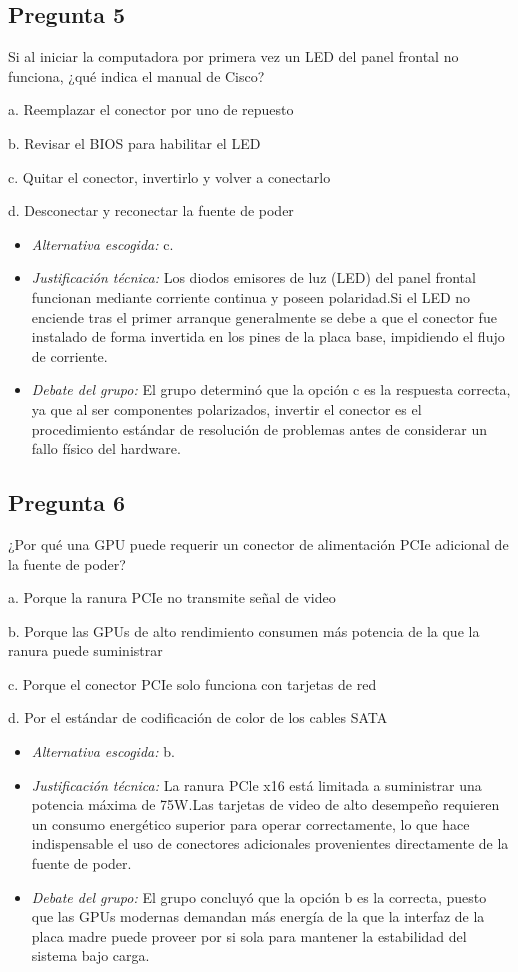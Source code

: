 \documentclass{article}
\begin{document}
\subsection{Pregunta 5}
\label{sec:org04b324c}
Si al iniciar la computadora por primera vez un LED del panel frontal no funciona, ¿qué indica el manual de Cisco?

a. Reemplazar el conector por uno de repuesto

b. Revisar el BIOS para habilitar el LED

c. Quitar el conector, invertirlo y volver a conectarlo

d. Desconectar y reconectar la fuente de poder

\begin{itemize}
\item \emph{Alternativa escogida:} c.
\item \emph{Justificación técnica:} Los diodos emisores de luz (LED) del panel
frontal funcionan mediante corriente continua y poseen polaridad.Si
el LED no enciende tras el primer arranque generalmente se debe a
que el conector fue instalado de forma invertida en los pines de la
placa base, impidiendo el flujo de corriente.
\item \emph{Debate del grupo:} El grupo determinó que la opción c es la
respuesta correcta, ya que al ser componentes polarizados, invertir
el conector es el procedimiento estándar de resolución de problemas
antes de considerar un fallo físico del hardware.
\end{itemize}

\subsection{Pregunta 6}
\label{sec:org81659f2}
¿Por qué una GPU puede requerir un conector de alimentación PCIe adicional de la fuente de poder?

a. Porque la ranura PCIe no transmite señal de video

b. Porque las GPUs de alto rendimiento consumen más potencia de la que la ranura puede suministrar

c. Porque el conector PCIe solo funciona con tarjetas de red

d. Por el estándar de codificación de color de los cables SATA

\begin{itemize}
\item \emph{Alternativa escogida:} b.
\item \emph{Justificación técnica:} La ranura PCle x16 está limitada a
suministrar una potencia máxima de 75W.Las tarjetas de video de alto
desempeño requieren un consumo energético superior para operar
correctamente, lo que hace indispensable el uso de conectores
adicionales provenientes directamente de la fuente de poder.
\item \emph{Debate del grupo:} El grupo concluyó que la opción b es la
correcta, puesto que las GPUs modernas demandan más energía de la
que la interfaz de la placa madre puede proveer por si sola para
mantener la estabilidad del sistema bajo carga.
\end{itemize}
\end{document}
